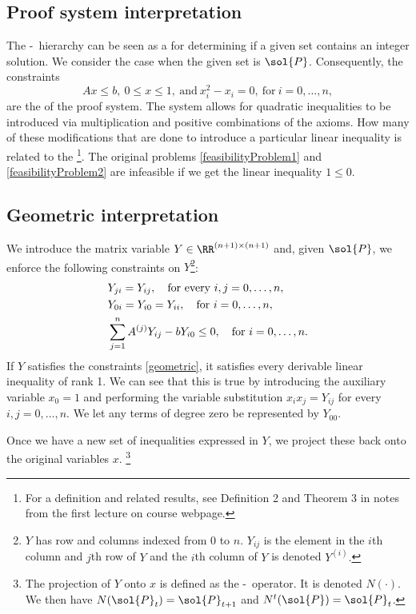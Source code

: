 \documentclass[a4paper,twoside,justified]{tufte-handout}
\begin{document}
\subsection{Proof system interpretation}
The \Lovasz-\Schrijver\ hierarchy can be seen as a  for determining if a given set contains an integer solution. We consider the case when the given set is $\sol{P}$. Consequently, the constraints 
\begin{equation}
Ax\leq b,\ 0\leq x\leq1,\ \text{and}\  x_i^2-x_i=0,\ \text{for}\ i=0,\ldots,n, 
\end{equation}
are the  of the proof system. The system allows for quadratic inequalities to be introduced via multiplication and positive combinations of the axioms. How many of these modifications that are done to introduce a particular linear inequality is related to the \footnote{For a definition and related results, see Definition 2 and Theorem 3 in notes from the first lecture on course webpage.}. The original problems \eqref{feasibilityProblem1} and \eqref{feasibilityProblem2} are infeasible if we get the linear inequality $1\leq0$.

\subsection{Geometric interpretation}
We introduce the matrix variable $Y\in\RR^{(n+1)\times(n+1)}$ and, given $\sol{P}$, we enforce the following constraints on $Y$\footnote{$Y$ has row and columns indexed from $0$ to $n$. $Y_{ij}$ is the element in the $i$th column and $j$th row of $Y$ and the $i$th column of $Y$ is denoted $Y^{(i)}.$}:
\begin{alignat}{2}
\label{geometric}
&Y_{ji}=Y_{ij}, \quad\text{for every}\ i,j=0,\ldots,n,\notag\\ 
&Y_{0i}=Y_{i0}=Y_{ii}, \quad\text{for}\ i=0,\ldots,n,\\
&\sum_{j=1}^{n} A^{(j)}Y_{ij}-bY_{i0}\leq 0, \quad\text{for}\ i=0,\ldots,n.\notag
\end{alignat}
If $Y$ satisfies the constraints \eqref{geometric}, it satisfies every derivable linear inequality of rank 1. We can see that this is true by introducing the auxiliary variable $x_0=1$ and performing the variable substitution $x_ix_j=Y_{ij}$ for every $i,j=0,\ldots,n$. We let any terms of degree zero be represented by $Y_{00}$. 

Once we have a new set of inequalities expressed in $Y$, we project these back onto the original variables $x$. \footnote{The projection of $Y$ onto $x$ is defined as the \Lovasz-\Schrijver\ operator. It is denoted $N(\cdot)$. We then have $N(\sol{P}_t)=\sol{P}_{t+1}$ and $N^t(\sol{P})=\sol{P}_t$.}
\end{document}
